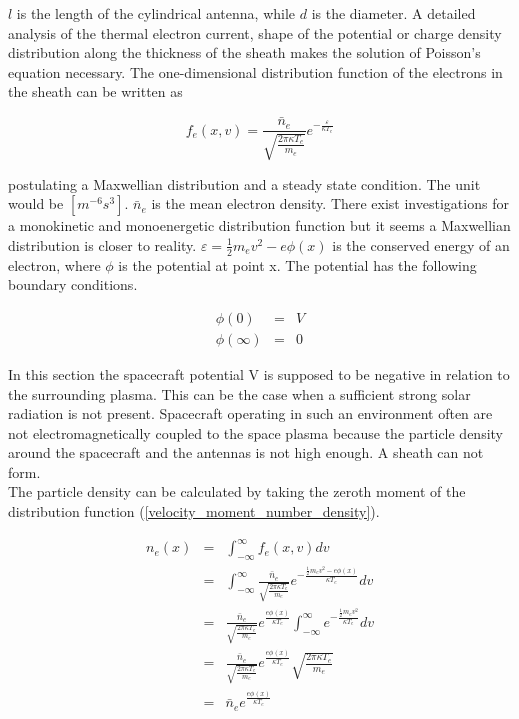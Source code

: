 \documentclass[a4paper,11pt]{thesis}
\begin{document}
$l$ is the length of the cylindrical antenna, while $d$ is the diameter. A detailed analysis of the thermal electron current, shape of the potential or charge density distribution along the thickness of the sheath makes the solution of Poisson's equation necessary. The one-dimensional distribution function of the electrons in the sheath can be written as

\begin{equation}
    f_e(x,v)=\frac{\bar{n}_e}{\sqrt{\frac{2 \pi \kappa T_e}{m_e}}}e^{-\frac{\varepsilon}{\kappa T_e}}
\end{equation}

postulating a Maxwellian distribution and a steady state condition. The unit would be $[m^{-6}s^3]$. $\bar{n}_e$ is the mean electron density. There exist investigations for a monokinetic and monoenergetic distribution function but it seems a Maxwellian distribution is closer to reality. $\varepsilon=\frac{1}{2}m_e v^2-e\phi(x)$ is the conserved energy of an electron, where $\phi$ is the potential at point x. The potential has the following boundary conditions.

\begin{eqnarray}
\phi(0)&=&V\\
\phi(\infty)&=&0
\end{eqnarray}

In this section the spacecraft potential V is supposed to be negative in relation to the surrounding plasma. This can be the case when a sufficient strong solar radiation is not present. Spacecraft operating in such an environment often are not electromagnetically coupled to the space plasma because the particle density around the spacecraft and the antennas is not high enough. A sheath can not form.\\

The particle density can be calculated by taking the zeroth moment of the distribution function (\ref{velocity_moment_number_density}).

\begin{eqnarray}
    n_e(x)&=&\int_{-\infty}^\infty f_e(x,v)dv\\
&=&\int_{-\infty}^\infty \frac{\bar{n}_e}{\sqrt{\frac{2 \pi \kappa T_e}{m_e}}}e^{-\frac{\frac{1}{2}m_e v^2-e\phi(x)}{\kappa T_e}}dv\\
&=&\frac{\bar{n}_e}{\sqrt{\frac{2 \pi \kappa T_e}{m_e}}} e^{\frac{e\phi(x)}{\kappa T_e}} \int_{-\infty}^\infty e^{-\frac{\frac{1}{2}m_e v^2}{\kappa T_e}}dv \label{eq:standard_integral}\\
&=&\frac{\bar{n}_e}{\sqrt{\frac{2 \pi \kappa T_e}{m_e}}} e^{\frac{e\phi(x)}{\kappa T_e}} \sqrt{\frac{2\pi \kappa T_e}{m_e}}\\
&=&\bar{n}_e e^{\frac{e\phi(x)}{\kappa T_e}}
\end{eqnarray}
\end{document}
